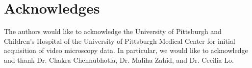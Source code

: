 \section{Acknowledges}

The authors would like to acknowledge the University of Pittsburgh and Children's Hospital of the University of Pittsburgh Medical Center for initial acquisition of video microscopy data. In particular, we would like to acknowledge and thank Dr. Chakra Chennubhotla, Dr. Maliha Zahid, and Dr. Cecilia Lo.


